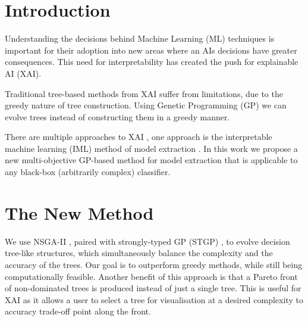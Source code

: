 \section{Introduction} 
Understanding the decisions behind Machine Learning (ML) techniques is important for their adoption into new areas where an AI\textquotesingle s decisions have greater consequences. This need for interpretability has created the push for explainable AI (XAI).


Traditional tree-based methods from XAI suffer from limitations, due to the greedy nature of tree construction. Using Genetic Programming (GP) \cite{Koza:GeneticProgramming} we can evolve trees instead of constructing them in a greedy manner.

There are multiple approaches to XAI \cite{Karlo:xai}, one approach is the interpretable machine learning (IML) method of model extraction \cite{Bastani:modelExtarct}. In this work we propose a new multi-objective GP-based method for model extraction that is applicable to any black-box (arbitrarily complex) classifier.

\section{The New Method}
We use NSGA-II \cite{Deb:nsga2}, paired with strongly-typed GP (STGP) \cite{Montana:stgp}, to evolve decision tree-like structures, which simultaneously balance the complexity and the accuracy of the trees. Our goal is to outperform greedy methods, while still being computationally feasible. Another benefit of this approach is that a Pareto front of non-dominated trees is produced instead of just a single tree. This is useful for XAI as it allows a user to select a tree for visualisation at a desired complexity to accuracy trade-off point along the front.

